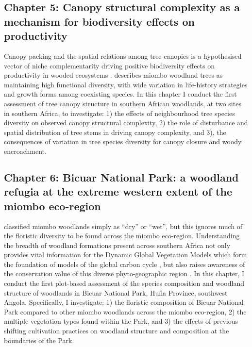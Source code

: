 \begin{refsection}
\subsection{Chapter 5: Canopy structural complexity as a mechanism for biodiversity effects on productivity}
\label{intro:ssec:chp5}

Canopy packing and the spatial relations among tree canopies is a hypothesised vector of niche complementarity driving positive biodiversity effects on productivity in wooded ecosystems \citep{Jucker2015, Oehri2020}. \citet{Frost1996} describes miombo woodland trees as maintaining high functional diversity, with wide variation in life-history strategies and growth forms among coexisting species. In this chapter I conduct the first assessment of tree canopy structure in southern African woodlands, at two sites in southern Africa, to investigate: 1) the effects of neighbourhood tree species diversity on observed canopy structural complexity, 2) the role of disturbance and spatial distribution of tree stems in driving canopy complexity, and 3), the consequences of variation in tree species diversity for canopy closure and woody encroachment.

\subsection{Chapter 6: Bicuar National Park: a woodland refugia at the extreme western extent of the miombo eco-region}
\label{intro:ssec:chp6}

\citet{White1983} classified miombo woodlands simply as ``dry'' or ``wet'', but this ignores much of the floristic diversity to be found across the miombo eco-region. Understanding the breadth of woodland formations present across southern Africa not only provides vital information for the Dynamic Global Vegetation Models which form the foundation of models of the global carbon cycle \citep{Conradi2020}, but also raises awareness of the conservation value of this diverse phyto-geographic region \citep{Jew2016}. In this chapter, I conduct the first plot-based assessment of the species composition and woodland structure of woodlands in Bicuar National Park, Hu\'{i}la Province, southwest Angola. Specifically, I investigate: 1) the floristic composition of Bicuar National Park compared to other miombo woodlands across the miombo eco-region, 2) the multiple vegetation types found within the Park, and 3) the effects of previous shifting cultivation practices on woodland structure and composition at the boundaries of the Park.


\end{refsection}
